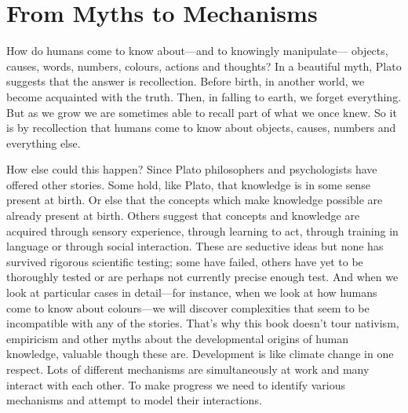 \documentclass[12pt,\papersize]{extarticle}
\date{}
\begin{document}
\setlength\footnotesep{1em}




\maketitle



\section{From Myths to Mechanisms}

How do humans come to know  about---and to knowingly manipulate---%
objects,
causes,
words,
numbers,
colours,
actions
and
thoughts?
In a beautiful myth, Plato suggests that the answer is recollection. 
Before birth, in another world, we become acquainted with the truth. 
Then, in falling to earth, we forget everything. 
But as we grow we are sometimes able to recall part of what we once knew.
So it is by recollection that humans come to know about objects, causes, numbers and everything else. 

How else could this happen?
Since Plato philosophers and psychologists have offered other stories.  
Some hold, like Plato, that knowledge is in some sense present at birth.
Or else that the concepts which make knowledge possible are already present at birth. 
Others suggest that concepts and knowledge are acquired through sensory experience, through learning to act, through training in language or through social interaction.
These are seductive ideas but none has survived rigorous scientific testing; some have failed, others have yet to be  thoroughly tested or are perhaps not  currently precise enough test. 
And when we look at particular cases in detail---for instance, when we look at how humans come to know about colours---we will discover complexities that seem to be incompatible with any of the stories. 
That's why this book doesn't tour nativism, empiricism and other myths about the developmental origins of human knowledge, valuable though these are. 
Development is like climate change in one respect.
Lots of different mechanisms are simultaneously at work and many interact with each other. 
To make progress we need to identify various mechanisms and attempt to model their interactions. 
\end{document}
